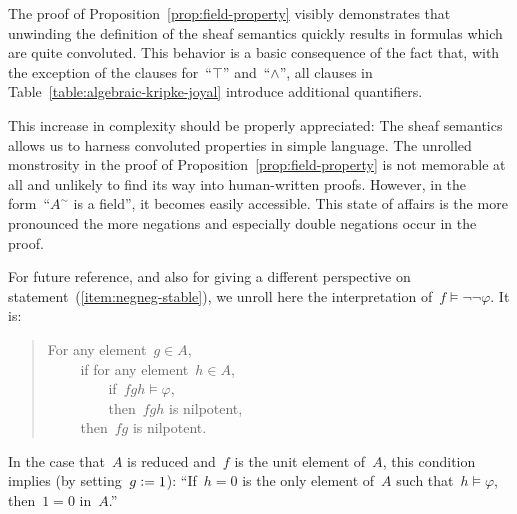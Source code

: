 \documentclass{ws-rv9x6}
\newcommand{\J}{\mathcal{J}}
\newcommand{\defeq}{\vcentcolon=}
\renewcommand{\_}{\mathpunct{.}}
\newcommand{\?}{\,{:}\,}
\begin{document}
The proof of Proposition~\ref{prop:field-property} visibly demonstrates that
unwinding the definition of the sheaf semantics quickly results in formulas
which are quite convoluted. This behavior is a basic consequence of the fact
that, with the exception of the clauses for~``$\top$'' and~``$\wedge$'', all
clauses in Table~\ref{table:algebraic-kripke-joyal} introduce additional
quantifiers.

This increase in complexity should be properly appreciated: The sheaf semantics
allows us to harness convoluted properties in simple language. The unrolled
monstrosity in the proof of Proposition~\ref{prop:field-property} is not
memorable at all and unlikely to find its way into human-written proofs.
However, in the form~``$A^\sim$ is a field'', it becomes easily accessible.
This state of affairs is the more pronounced the more negations and especially
double negations occur in the proof.


\begin{example}For future reference, and also for giving a different
perspective on statement~(\ref{item:negneg-stable}), we unroll here the
interpretation of~$f \models \neg\neg\varphi$. It is:
\begin{quote}
For any element~$g \in A$, \\
${\qquad}$ if for any element~$h \in A$, \\
${\qquad\qquad}$ if~$fgh \models \varphi$, \\
${\qquad\qquad}$ then~$fgh$ is nilpotent, \\
${\qquad}$ then~$fg$ is nilpotent.
\end{quote}
In the case that~$A$ is reduced and~$f$ is the unit element of~$A$, this
condition implies (by setting~$g \defeq 1$): ``If~$h = 0$ is the only element of~$A$
such that~$h \models \varphi$, then~$1 = 0$ in~$A$.''
\end{example}
\end{document}
